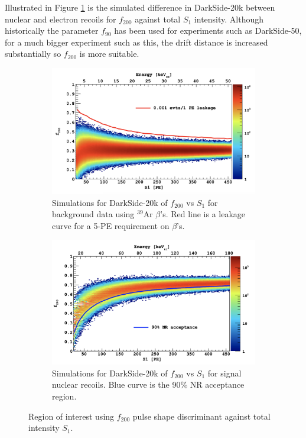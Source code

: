 \documentclass[11pt]{article} %
\begin{document}
Illustrated in Figure \ref{fig:psd} is the simulated difference in DarkSide-20k between nuclear and electron recoils for $f_{200}$ against total $S_1$ intensity.
Although historically the parameter $f_{90}$ has been used for experiments such as DarkSide-50, for a much bigger experiment such as this, the drift distance is increased substantially so
$f_{200}$ is more suitable.
\begin{figure}[H]
\begin{minipage}{.49\textwidth}
  \centering
  \begin{subfigure}{\textwidth}
      \centering\captionsetup{width=.9\linewidth}%
      \includegraphics[width=\textwidth]{./images/psd_background.png}
      \caption{Simulations for DarkSide-20k of $f_{200}$ vs $S_1$ for background data using $^{39}\mathrm{\text{Ar}}$ $\beta$'s.
      Red line is a leakage curve for a 5-PE requirement on $\beta$'s.}
  \end{subfigure}
\end{minipage}
\begin{minipage}{.49\textwidth}
  \centering
  \begin{subfigure}{\textwidth}
      \centering\captionsetup{width=.9\linewidth}%
      \includegraphics[width=\textwidth]{./images/psd_signal.png}
      \caption{Simulations for DarkSide-20k of $f_{200}$ vs $S_1$ for signal nuclear recoils.
      Blue curve is the 90\% NR acceptance region.}
  \end{subfigure}
\end{minipage}
\caption{\cite{aalseth2018darkside} Region of interest using $f_{200}$ pulse shape discriminant against total intensity $S_1$.}
\label{fig:psd}
\end{figure}
\end{document}
